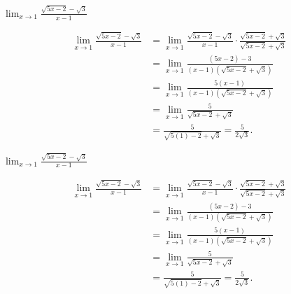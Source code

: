 \documentclass[nooutcomes]{ximera}
\renewenvironment{freeResponse}{
\ifhandout\setbox0\vbox\bgroup\else
\begin{trivlist}\item[\hskip \labelsep\bfseries Solution:\hspace{2ex}]
\fi}
{\ifhandout\egroup\else
\end{trivlist}
\fi}
\begin{document}
\begin{problem}
\begin{itemize}
    \item[(d)]
      $\displaystyle
        \lim_{x \to 1} \frac{\sqrt{5x-2} - \sqrt{3}}{x-1}
      $
      \begin{freeResponse}
        \begin{align*}
          \lim_{x \to 1} \frac{\sqrt{5x-2} - \sqrt{3}}{x-1}
          &= \lim_{x \to 1} \frac{\sqrt{5x-2} - \sqrt{3}}{x-1} \cdot \frac{\sqrt{5x-2} + \sqrt{3}}{\sqrt{5x-2} + \sqrt{3}}\\
          &= \lim_{x \to 1} \frac{(5x-2)-3}{(x-1)(\sqrt{5x-2} + \sqrt{3})}\\
          &= \lim_{x \to 1} \frac{5(x-1)}{(x-1)(\sqrt{5x-2} + \sqrt{3})}\\
          &= \lim_{x \to 1} \frac{5}{\sqrt{5x-2} + \sqrt{3}}\\
          &= \frac{5}{\sqrt{5(1)-2} + \sqrt{3}} = \frac{5}{2 \sqrt{3}}.
	\end{align*}
      \end{freeResponse}

    \item[(d)]
      $\displaystyle
        \lim_{x \to 1} \frac{\sqrt{5x-2} - \sqrt{3}}{x-1}
      $
      \begin{freeResponse}
       	\begin{align*}
          \lim_{x \to 1} \frac{\sqrt{5x-2} - \sqrt{3}}{x-1}
          &= \lim_{x \to 1} \frac{\sqrt{5x-2} - \sqrt{3}}{x-1} \cdot \frac{\sqrt{5x-2} + \sqrt{3}}{\sqrt{5x-2} + \sqrt{3}}\\
          &= \lim_{x \to 1} \frac{(5x-2)-3}{(x-1)(\sqrt{5x-2} + \sqrt{3})}\\
          &= \lim_{x \to 1} \frac{5(x-1)}{(x-1)(\sqrt{5x-2} + \sqrt{3})}\\
          &= \lim_{x \to 1} \frac{5}{\sqrt{5x-2} + \sqrt{3}}\\
          &= \frac{5}{\sqrt{5(1)-2} + \sqrt{3}} = \frac{5}{2 \sqrt{3}}.
	\end{align*}
      \end{freeResponse}
  \end{itemize}
\end{problem}
\end{document}
